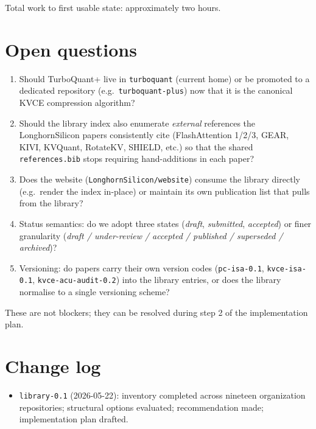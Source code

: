 \documentclass[11pt]{article}
\begin{document}
Total work to first usable state: approximately two hours.

\section{Open questions}

\begin{enumerate}
\item Should TurboQuant+ live in \texttt{turboquant} (current home)
or be promoted to a dedicated repository (e.g.\ \texttt{turboquant-plus})
now that it is the canonical KVCE compression algorithm?
\item Should the library index also enumerate \emph{external}
references the LonghornSilicon papers consistently cite (FlashAttention
1/2/3, GEAR, KIVI, KVQuant, RotateKV, SHIELD, etc.) so that
the shared \texttt{references.bib} stops requiring hand-additions
in each paper?
\item Does the website (\texttt{LonghornSilicon/website}) consume the
library directly (e.g.\ render the index in-place) or maintain its
own publication list that pulls from the library?
\item Status semantics: do we adopt three states
(\textit{draft}, \textit{submitted}, \textit{accepted}) or finer
granularity (\textit{draft / under-review / accepted / published /
superseded / archived})?
\item Versioning: do papers carry their own version codes
(\texttt{pc-isa-0.1}, \texttt{kvce-isa-0.1}, \texttt{kvce-acu-audit-0.2})
into the library entries, or does the library normalise to a single
versioning scheme?
\end{enumerate}

These are not blockers; they can be resolved during step 2 of the
implementation plan.

\section*{Change log}

\begin{itemize}
\item \texttt{library-0.1} (2026-05-22): inventory completed
across nineteen organization repositories; structural options
evaluated; recommendation made; implementation plan drafted.
\end{itemize}
\end{document}
